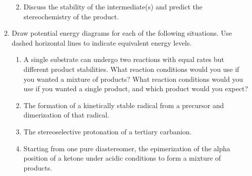 \documentclass[../psets.tex]{subfiles}
\begin{document}
\begin{enumerate}
\begin{enumerate}
\begin{center}
        \end{center}
        \item Discuss the stability of the intermediate(s) and predict the stereochemistry of the product.
    \end{enumerate}
    \pagebreak
    \item Draw potential energy diagrams for each of the following situations. Use dashed horizontal lines to indicate equivalent energy levels.
    \begin{enumerate}
        \item A single substrate can undergo two reactions with equal rates but different product stabilities. What reaction conditions would you use if you wanted a mixture of products? What reaction conditions would you use if you wanted a single product, and which product would you expect?
        \item The formation of a kinetically stable radical from a precursor and dimerization of that radical.
        \item The stereoselective protonation of a tertiary carbanion.
        \item Starting from one pure diastereomer, the epimerization of the alpha position of a ketone under acidic conditions to form a mixture of products.
    \end{enumerate}
\end{enumerate}
\end{document}
